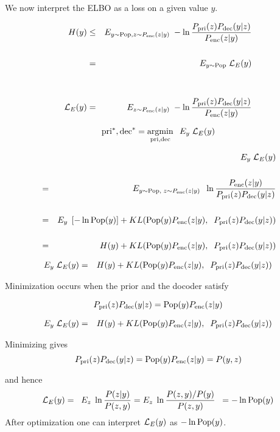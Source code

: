 {

We now interpret the ELBO as a loss on a given value $y$.

{\huge
\begin{eqnarray*}
H(y) & \leq & E_{y\sim \mathrm{Pop}, z \sim P_{\mathrm{enc}}(z|y)}\;-\ln \frac{P_{\mathrm{pri}}(z)P_{\mathrm{dec}}(y|z)}{P_{\mathrm{enc}}(z|y)} \\
\\
& = & E_{y \sim \mathrm{Pop}}\; {\cal L}_E(y) \\
\\
\\
{\cal L}_E(y) & = & E_{ z \sim P_{\mathrm{enc}}(z|y)}\;-\ln \frac{P_{\mathrm{pri}}(z)P_{\mathrm{dec}}(y|z)}{P_{\mathrm{enc}}(z|y)} \\
\end{eqnarray*}
}


$$\mathrm{pri}^*,\mathrm{dec}^*  = \operatorname*{argmin}_{\mathrm{pri},\mathrm{dec}}\;\;E_{y}\;{\cal L}_E(y)$$

\vfill
\begin{eqnarray*}
  & &   E_y\;{\cal L}_E(y) \\
  \\
  & = & E_{y \sim \mathrm{Pop},\;z\sim P_{\mathrm{enc}}(z|y)} \;\; \ln \frac{P_{\mathrm{enc}}(z|y)}{P_{\mathrm{pri}}(z)P_{\mathrm{dec}}(y|z)} \\
  \\
  & = & E_y\;\left[-\ln \mathrm{Pop}(y)\right] + KL(\mathrm{Pop}(y)P_{\mathrm{enc}}(z|y),\;\;P_{\mathrm{pri}}(z)P_{\mathrm{dec}}(y|z)) \\
  \\
  & = & H(y) + KL(\mathrm{Pop}(y)P_{\mathrm{enc}}(z|y),\;\;P_{\mathrm{pri}}(z)P_{\mathrm{dec}}(y|z))
\end{eqnarray*}


\begin{eqnarray*}
  E_y\;{\cal L}_E(y)
  & = & H(y) + KL(\mathrm{Pop}(y)P_{\mathrm{enc}}(z|y),\;\;P_{\mathrm{pri}}(z)P_{\mathrm{dec}}(y|z))
\end{eqnarray*}

\vfill
Minimization occurs when the prior and the docoder satisfy

\vfill
$$P_{\mathrm{pri}}(z)P_{\mathrm{dec}}(y|z) = \mathrm{Pop}(y)P_{\mathrm{enc}}(z|y)$$


\begin{eqnarray*}
  E_y\;{\cal L}_E(y)
  & = & H(y) + KL(\mathrm{Pop}(y)P_{\mathrm{enc}}(z|y),\;\;P_{\mathrm{pri}}(z)P_{\mathrm{dec}}(y|z))
\end{eqnarray*}

\vfill
Minimizing gives
$$P_{\mathrm{pri}}(z)P_{\mathrm{dec}}(y|z) = \mathrm{Pop}(y)P_{\mathrm{enc}}(z|y) = P(y,z)$$

\vfill
and hence
$${\cal L}_E(y) = \;\;E_z\;\ln \frac{P(z|y)}{P(z,y)} = E_z\;\ln \frac{P(z,y)/P(y)}{P(z,y)}\;\; = -\ln \mathrm{Pop}(y)$$
\vfill
After optimization one can interpret ${\cal L}_E(y)$ as $-\ln \mathrm{Pop}(y)$.

}

